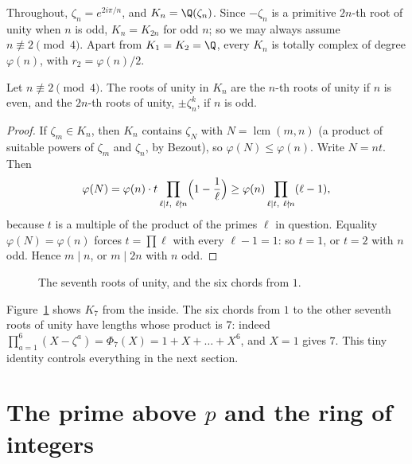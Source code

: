 Throughout, $\zeta_n=e^{2i\pi/n}$, and $K_n=\Q(\zeta_n)$. Since $-\zeta_n$ is a primitive $2n$-th root of unity when $n$ is
odd, $K_n=K_{2n}$ for odd $n$; so we may always assume $n\not\equiv2\pmod4$. Apart from $K_1=K_2=\Q$, every $K_n$ is
totally complex of degree $\varphi(n)$, with $r_2=\varphi(n)/2$.

\begin{proposition}\label{prop:muKn}
Let $n\not\equiv2\pmod 4$. The roots of unity in $K_n$ are the $n$-th roots of unity if $n$ is even, and the $2n$-th roots
of unity, $\pm\zeta_n^k$, if $n$ is odd.
\end{proposition}
\begin{proof}
If $\zeta_m\in K_n$, then $K_n$ contains $\zeta_N$ with $N=\operatorname{lcm}(m,n)$ (a product of suitable powers of
$\zeta_m$ and $\zeta_n$, by Bezout), so $\varphi(N)\le\varphi(n)$. Write $N=nt$. Then
\[
\varphi(N)=\varphi(n)\cdot t\prod_{\ell\mid t,\ \ell\nmid n}\Bigl(1-\frac1\ell\Bigr)\ge\varphi(n)\prod_{\ell\mid t,\ \ell\nmid n}(\ell-1),
\]
because $t$ is a multiple of the product of the primes $\ell$ in question. Equality $\varphi(N)=\varphi(n)$ forces
$t=\prod\ell$ with every $\ell-1=1$: so $t=1$, or $t=2$ with $n$ odd. Hence $m\mid n$, or $m\mid2n$ with $n$ odd.
\end{proof}

\begin{figure}[ht]
\centering
{}
\caption{The seventh roots of unity, and the six chords from $1$.}
\label{fig:roots}
\end{figure}

Figure~\ref{fig:roots} shows $K_7$ from the inside. The six chords from $1$ to the other seventh roots of unity have lengths
whose product is $7$: indeed $\prod_{a=1}^{6}(X-\zeta^a)=\Phi_7(X)=1+X+\dots+X^6$, and $X=1$ gives $7$. This tiny identity
controls everything in the next section.

\section{The prime above $p$ and the ring of integers}

